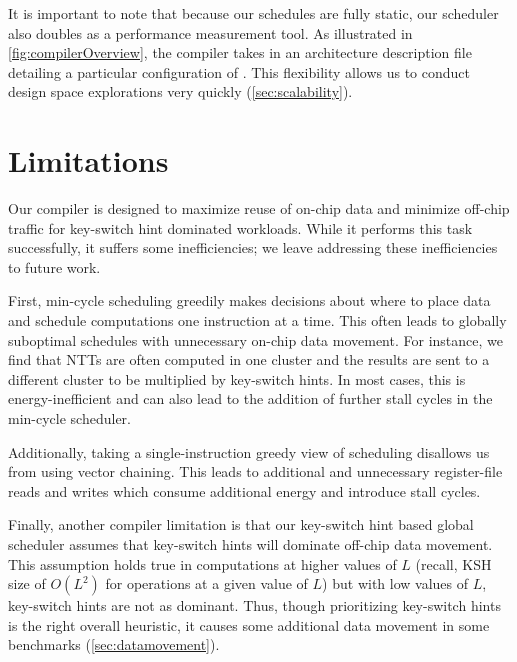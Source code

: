 It is important to note that because our schedules are fully static, our scheduler also doubles as a performance measurement tool. As illustrated in \autoref{fig:compilerOverview}, the compiler takes in an architecture description file detailing a particular configuration of \name. This flexibility allows us to conduct design space explorations very quickly (\autoref{sec:scalability}).

\section{Limitations}

Our compiler is designed to maximize reuse of on-chip data and minimize off-chip traffic for key-switch hint dominated workloads. While it performs this task successfully, it suffers some inefficiencies; we leave addressing these inefficiencies to future work.

First, min-cycle scheduling greedily makes decisions about where to place data and schedule computations one instruction at a time.
This often leads to globally suboptimal schedules with unnecessary on-chip data movement. 
For instance, we find that NTTs are often computed in one cluster and the results are sent to a different cluster to be multiplied by key-switch hints. 
In most cases, this is energy-inefficient and can also lead to the addition of further stall cycles in the min-cycle scheduler.

Additionally, taking a single-instruction greedy view of scheduling disallows us from using vector chaining. This leads to additional and unnecessary register-file reads and writes which consume additional energy and introduce stall cycles.

Finally, another compiler limitation is that our key-switch hint based global scheduler assumes that key-switch hints will dominate off-chip data movement. This assumption holds true in computations at higher values of $L$ (recall, KSH size of $O(L^2)$ for operations at a given value of $L$) but with low values of $L$, key-switch hints are not as dominant. Thus, though prioritizing key-switch hints is the right overall heuristic, it causes some additional data movement in some benchmarks (\autoref{sec:datamovement}).
